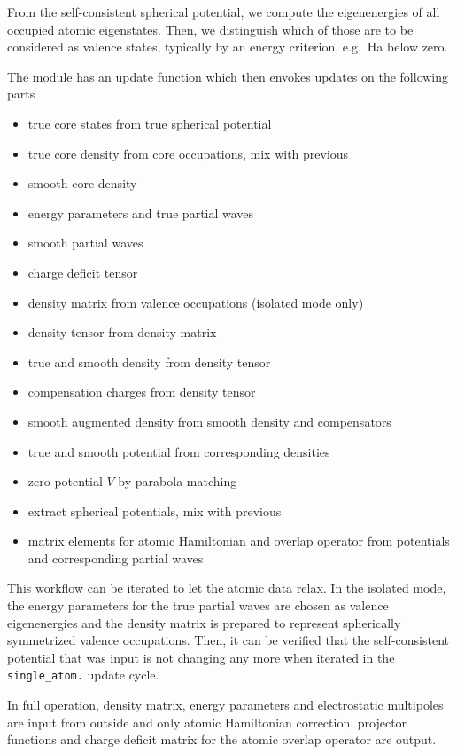 \documentclass[oribibl]{llncs}
\newcommand{\ttt}[1]{\texttt{#1}}
\begin{document}
From the self-consistent spherical potential, we compute the eigenenergies
of all occupied atomic eigenstates.
Then, we distinguish which of those are to be considered as valence states, 
typically by an energy criterion, e.g.~\unit[1]{Ha} below zero.

The module has an update function which then envokes updates on the following parts
\begin{itemize}
 \item true core states from true spherical potential
 \item true core density from core occupations, mix with previous
 \item smooth core density
 \item energy parameters and true partial waves
 \item smooth partial waves
 \item charge deficit tensor
 \item density matrix from valence occupations (isolated mode only)
 \item density tensor from density matrix
 \item true and smooth density from density tensor
 \item compensation charges from density tensor
 \item smooth augmented density from smooth density and compensators
 \item true and smooth potential from corresponding densities
 \item zero potential $\bar V$ by parabola matching
 \item extract spherical potentials, mix with previous
 \item matrix elements for atomic Hamiltonian and overlap operator 
		from potentials and corresponding partial waves
\end{itemize}

This workflow can be iterated to let the atomic data relax.
In the isolated mode, the energy parameters for the true partial waves are chosen as valence eigenenergies
and the density matrix is prepared to represent spherically symmetrized valence occupations.
Then, it can be verified that the self-consistent potential that was input is
not changing any more when iterated in the \ttt{single\_atom.} update cycle.

In full operation, density matrix, energy parameters and electrostatic multipoles
are input from outside and only atomic Hamiltonian correction, projector functions
and charge deficit matrix for the atomic overlap operator are output. 
\end{document}
